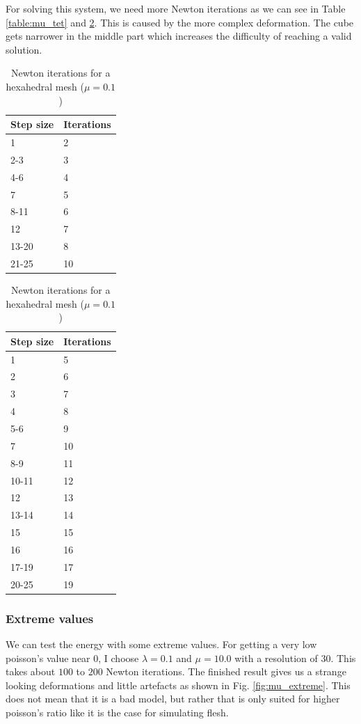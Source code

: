 For solving this system, we need more Newton iterations as we can see in Table \ref{table:mu_tet}  and \ref{table:mu_hex}. This is caused by the more complex deformation. The cube gets narrower in the middle part which increases the difficulty of reaching a valid solution.
\begin{table}[!htbp]
\parbox{.45\linewidth}{
\centering
\begin{tabular}{ | l | l |}
\hline
\textbf{Step size} & \textbf{Iterations} \\ \hline
1 & 2 \\ \hline
2-3 & 3 \\ \hline
4-6 & 4 \\ \hline
7 & 5 \\ \hline
8-11 & 6 \\ \hline
12 & 7 \\ \hline
13-20 & 8 \\ \hline
21-25 & 10 \\ \hline
\end{tabular}
\caption{Newton iterations for a tetrahedral mesh ($\mu = 0.1$)}
\label{table:mu_tet}
}
\hfill
\parbox{.45\linewidth}{
\centering
\begin{tabular}{ | l | l |}
\hline
\textbf{Step size} & \textbf{Iterations} \\ \hline
1 & 5 \\ \hline
2 & 6 \\ \hline
3 & 7 \\ \hline
4 & 8 \\ \hline
5-6 & 9 \\ \hline
7 & 10 \\ \hline
8-9 & 11 \\ \hline
10-11 & 12 \\ \hline
12 & 13 \\ \hline
13-14 & 14 \\ \hline
15 & 15 \\ \hline
16 & 16 \\ \hline
17-19 & 17 \\ \hline
20-25 & 19 \\ \hline
\end{tabular}
\caption{Newton iterations for a hexahedral mesh ($\mu = 0.1$)}
\label{table:mu_hex}
}
\end{table}


\subsubsection{Extreme values}
We can test the energy with some extreme values. For getting a very low poisson's value near 0, I choose $\lambda = 0.1$ and $\mu = 10.0$ with a resolution of $30$. This takes about $100$ to $200$ Newton iterations. The finished result gives us a strange looking deformations and little artefacts as shown in Fig. \ref{fig:mu_extreme}. This does not mean that it is a bad model, but rather that is only suited for higher poisson's ratio like it is the case for simulating flesh.

